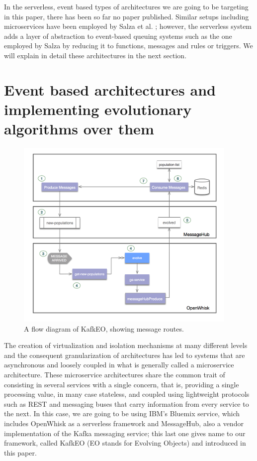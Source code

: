 \documentclass[sigconf]{acmart}
\begin{document}
In the serverless, event based types of architectures we are going to
be targeting in this paper, there has been so far no paper
published. Similar setups including microservices have been employed by Salza et
al. \cite{salza2017ccube}; however, the serverless system adds a layer
of abstraction to event-based queuing systems such as the one employed
by Salza by reducing it to functions, messages and rules or
triggers. We will explain in detail these architectures in the next
section. 

\section{Event based architectures and implementing evolutionary
  algorithms over them}
\label{sec:methods}
%
\begin{figure}[h!tbp]
\includegraphics[width=0.95\textwidth]{img/kafka.png}
\caption{A flow diagram of KafkEO, showing message routes.}
\label{fig:kafkeo}
\end{figure}
%
The creation of virtualization and isolation mechanisms at many
different levels and the consequent granularization of architectures
has led to systems that are asynchronous and loosely coupled in what
is generally called a microservice architecture. These microservice
architectures share the common trait of consisting in several services
with a single concern, that is, providing a single processing value,
in many case stateless, and coupled using lightweight protocols such
as REST and messaging buses that carry information from every service
to the next. In this case, we are going to be using IBM's Bluemix
service, which includes OpenWhisk as a serverless framework and
MessageHub, also a vendor implementation of the Kafka messaging
service; this last one gives name to our framework, called KafkEO (EO
stands for Evolving Objects) and introduced in this paper.
\end{document}
